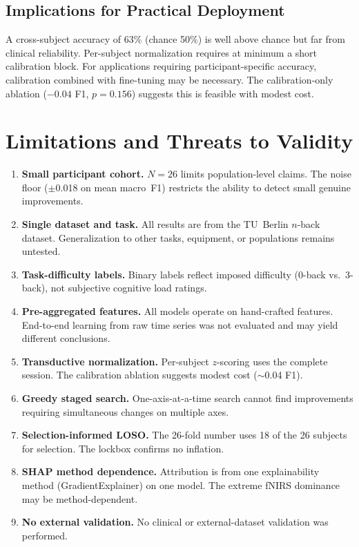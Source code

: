 \documentclass[conference]{IEEEtran}
\begin{document}
\subsection{Implications for Practical Deployment}
A cross-subject accuracy of 63\% (chance 50\%) is well above chance but far from clinical reliability. Per-subject normalization requires at minimum a short calibration block. For applications requiring participant-specific accuracy, calibration combined with fine-tuning may be necessary. The calibration-only ablation ($-0.04$ F1, $p = 0.156$) suggests this is feasible with modest cost.

\section{Limitations and Threats to Validity}

\begin{enumerate}
    \item \textbf{Small participant cohort.} $N = 26$ limits population-level claims. The noise floor ($\pm$0.018 on mean macro~F1) restricts the ability to detect small genuine improvements.
    \item \textbf{Single dataset and task.} All results are from the TU~Berlin $n$-back dataset. Generalization to other tasks, equipment, or populations remains untested.
    \item \textbf{Task-difficulty labels.} Binary labels reflect imposed difficulty (0-back vs.\ 3-back), not subjective cognitive load ratings.
    \item \textbf{Pre-aggregated features.} All models operate on hand-crafted features. End-to-end learning from raw time series was not evaluated and may yield different conclusions.
    \item \textbf{Transductive normalization.} Per-subject $z$-scoring uses the complete session. The calibration ablation suggests modest cost ($\sim$0.04 F1).
    \item \textbf{Greedy staged search.} One-axis-at-a-time search cannot find improvements requiring simultaneous changes on multiple axes.
    \item \textbf{Selection-informed LOSO.} The 26-fold number uses 18 of the 26 subjects for selection. The lockbox confirms no inflation.
    \item \textbf{SHAP method dependence.} Attribution is from one explainability method (GradientExplainer) on one model. The extreme fNIRS dominance may be method-dependent.
    \item \textbf{No external validation.} No clinical or external-dataset validation was performed.
\end{enumerate}
\end{document}
